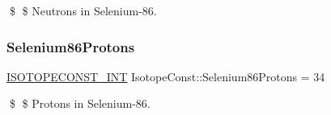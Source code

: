 \$ \$ Neutrons in Selenium-\/86. \mbox{\label{group___isotope_const-_selenium-_se86_gaec8077643e5c72f70a35a673cc9441f6}} 
\subsubsection{\texorpdfstring{Selenium86\+Protons}{Selenium86Protons}}
{\footnotesize\ttfamily \mbox{\hyperlink{group___isotope_const-_macros_ga5f18360b3e99483a35c32d789e62621c}{I\+S\+O\+T\+O\+P\+E\+C\+O\+N\+S\+T\+\_\+\+I\+NT}} Isotope\+Const\+::\+Selenium86\+Protons = 34}

\$ \$ Protons in Selenium-\/86. 